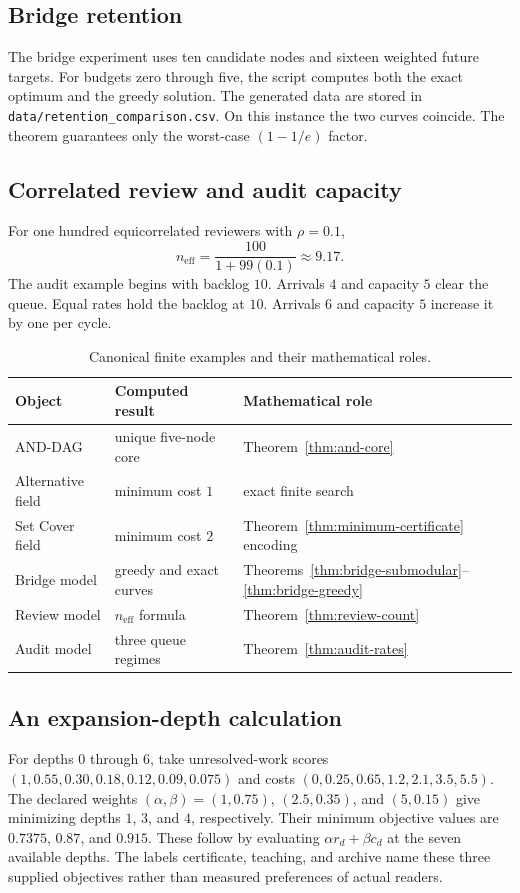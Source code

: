 \documentclass[11pt,oneside]{article}
\theoremstyle{komorebiplain}
\theoremstyle{komorebidefinition}
\theoremstyle{komorebiremark}
\begin{document}
\subsection{Bridge retention}

The bridge experiment uses ten candidate nodes and sixteen weighted future targets. For budgets zero through five, the script computes both the exact optimum and the greedy solution. The generated data are stored in \texttt{data/retention\_comparison.csv}. On this instance the two curves coincide. The theorem guarantees only the worst-case $(1-1/e)$ factor.

\subsection{Correlated review and audit capacity}

For one hundred equicorrelated reviewers with $\rho=0.1$,
\[
n_{\mathrm{eff}}
=
\frac{100}{1+99(0.1)}
\approx 9.17.
\]
The audit example begins with backlog $10$. Arrivals $4$ and capacity $5$ clear the queue. Equal rates hold the backlog at $10$. Arrivals $6$ and capacity $5$ increase it by one per cycle.

\begin{table}[H]
\centering
\caption{Canonical finite examples and their mathematical roles.}
\begin{tabular}{@{}lll@{}}
\toprule
Object & Computed result & Mathematical role\\
\midrule
AND-DAG & unique five-node core & Theorem~\ref{thm:and-core}\\
Alternative field & minimum cost $1$ & exact finite search\\
Set Cover field & minimum cost $2$ & Theorem~\ref{thm:minimum-certificate} encoding\\
Bridge model & greedy and exact curves & Theorems~\ref{thm:bridge-submodular}--\ref{thm:bridge-greedy}\\
Review model & $n_{\mathrm{eff}}$ formula & Theorem~\ref{thm:review-count}\\
Audit model & three queue regimes & Theorem~\ref{thm:audit-rates}\\
\bottomrule
\end{tabular}
\end{table}


\subsection{An expansion-depth calculation}
\label{sec:depth-example}
For depths $0$ through $6$, take unresolved-work scores
$(1,0.55,0.30,0.18,0.12,0.09,0.075)$ and costs
$(0,0.25,0.65,1.2,2.1,3.5,5.5)$. The declared weights
$(\alpha,\beta)=(1,0.75)$, $(2.5,0.35)$, and $(5,0.15)$ give
minimizing depths $1$, $3$, and $4$, respectively. Their minimum objective
values are $0.7375$, $0.87$, and $0.915$. These follow by evaluating
$\alpha r_d+\beta c_d$ at the seven available depths. The labels certificate,
teaching, and archive name these three supplied objectives rather than
measured preferences of actual readers.
\end{document}
